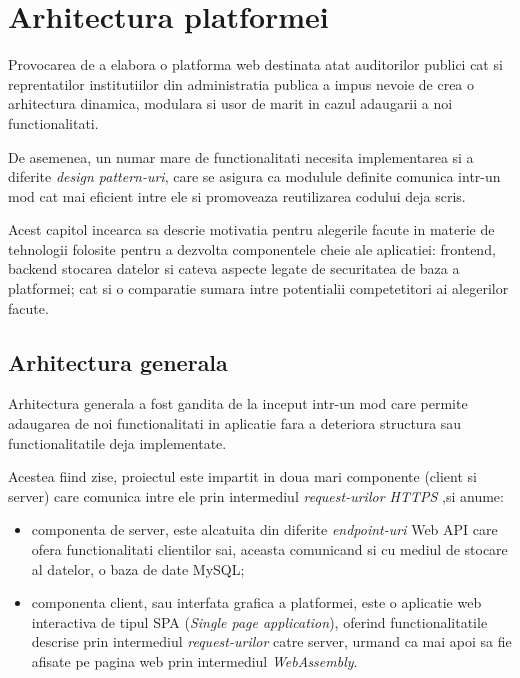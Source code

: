 \chapter{Arhitectura platformei}
 Provocarea de a elabora o platforma web destinata atat auditorilor publici cat si reprentatilor institutiilor din administratia publica  a impus nevoie de crea o arhitectura dinamica, modulara si usor de marit in cazul adaugarii a noi functionalitati.
 
De asemenea, un numar mare de functionalitati necesita implementarea si a diferite \textit{design pattern-uri}, care se asigura ca modulule definite comunica intr-un mod cat mai eficient intre ele si promoveaza reutilizarea codului deja scris.

Acest capitol incearca sa descrie motivatia pentru alegerile facute in materie de tehnologii folosite pentru a dezvolta componentele cheie ale aplicatiei: frontend, backend stocarea datelor si cateva aspecte legate de securitatea de baza a platformei; cat si o comparatie sumara intre potentialii competetitori ai alegerilor facute.

\section {Arhitectura generala}
Arhitectura generala a fost gandita de la inceput intr-un mod care permite adaugarea de noi functionalitati in aplicatie fara a deteriora structura sau functionalitatile deja implementate.

Acestea fiind zise, proiectul este impartit in doua mari componente (client si server)  care comunica intre ele prin intermediul \textit{request-urilor HTTPS} ,si anume:

\begin{itemize}
	
	\item componenta de server, este alcatuita din diferite \textit{endpoint-uri}  Web API care ofera functionalitati clientilor sai, aceasta comunicand si cu mediul de stocare al datelor, o baza de date MySQL;
	
	\item componenta client, sau interfata grafica a platformei, este o aplicatie web interactiva de tipul SPA (\textit{Single page application}), oferind functionalitatile descrise prin intermediul \textit{request-urilor} catre server, urmand ca mai apoi sa fie afisate pe pagina web prin intermediul \textit{WebAssembly}.
\end{itemize}  

